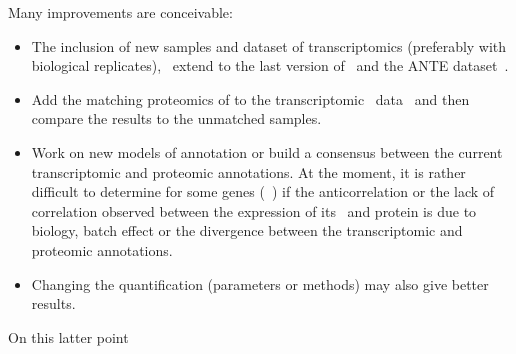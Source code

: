 Many improvements are conceivable:\begin{itemize}
        \item The inclusion of new samples and dataset of transcriptomics
            (preferably with biological replicates),
            \eg\ extend to the last version of \gtex\ and
            the ANTE dataset~.
        \item Add the matching proteomics of \citet{Wang2019-ut}
            to the transcriptomic \uhlen\ data~
            and then compare the results to the unmatched samples.
        \item Work on new models of annotation or
            build a consensus between the current transcriptomic and proteomic
            annotations.
            At the moment, it is rather difficult to determine for some genes
            (\eg\ )
            if the anticorrelation or the lack of correlation observed
            between the expression of its \mRNA\ and protein is due to biology,
            batch effect or the divergence between the transcriptomic and
            proteomic annotations.
        \item Changing the quantification (parameters or methods)
            may also give better results.
\end{itemize}

On this latter point 




%
%
%
%
%
%
%

